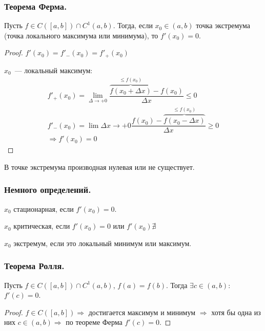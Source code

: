 \documentclass[12pt]{article}
\begin{document}
	\subsubsection{Теорема Ферма.}
	\begin{theorem}[Ферма]
		Пусть $f \in C([a, b]) \cap C^1(a, b)$. Тогда, если $x_0 \in (a, b)$ точка экстремума (точка локального максимума или минимума), то $f'(x_0) = 0$.
	\end{theorem}
	\begin{proof}
		$f'(x_0) = f'_-(x_0) = f'_+(x_0)$
		
		$x_0$~--- локальный максимум:
		\begin{align*}
			f'_+(x_0) = \lim\limits_{\varDelta \to +0} \dfrac{\overbrace{f(x_0 + \varDelta x)}^{\leqslant f(x_0)} - f(x_0)}{\varDelta x} \leqslant 0\\
			f'_-(x_0) = \lim\limits{\varDelta x \to +0} \dfrac{f(x_0) - \overbrace{f(x_0 - \varDelta x)}^{\leqslant f(x_0)}}{\varDelta x} \geqslant 0\\
			\Rightarrow f'(x_0) = 0
		\end{align*}
	\end{proof}
	\begin{corollary}
		В точке экстремума производная нулевая или не существует.
	\end{corollary}
	\subsubsection{Немного определений.}
	\begin{definition}
		$x_0$ стационарная, если $f'(x_0) = 0$.
	\end{definition}
	\begin{definition}
		$x_0$ критическая, если $f'(x_0) = 0$ или $f'(x_0) \nexists$
	\end{definition}
	\begin{definition}
		$x_0$ экстремум, если это локальный минимум или максимум.
	\end{definition}
	\subsubsection{Теорема Ролля.}
	\begin{theorem}[Ролля]
		Пусть $f \in C([a, b]) \cap C^1(a, b)$, $f(a) = f(b)$. Тогда $\exists c \in (a, b)$: $f'(c) = 0$.
	\end{theorem}
	\begin{proof}
		$f \in C([a, b]) \Rightarrow$ достигается максимум и минимум $\Rightarrow$ хотя бы одна из них $c \in (a, b) \Rightarrow$ по теореме Ферма $f'(c) = 0$.
	\end{proof}
\end{document}
